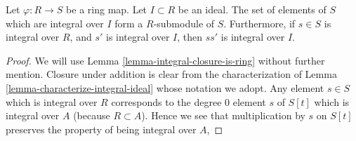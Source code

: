 \begin{lemma}
\label{lemma-integral-over-ideal-is-submodule}
Let $\varphi : R \to S$ be a ring map.
Let $I \subset R$ be an ideal.
The set of elements of $S$ which are integral
over $I$ form a $R$-submodule of $S$.
Furthermore, if $s \in S$ is integral over
$R$, and $s'$ is integral over $I$, then
$ss'$ is integral over $I$.
\end{lemma}

\begin{proof}
We will use Lemma \ref{lemma-integral-closure-is-ring} without
further mention. Closure under addition is clear from the
characterization of Lemma \ref{lemma-characterize-integral-ideal}
whose notation we adopt.
Any element $s \in S$ which is integral over
$R$ corresponds to the degree $0$ element $s$ of $S[t]$
which is integral over $A$ (because $R \subset A$).
Hence we see that multiplication by $s$ on $S[t]$
preserves the property of being integral over $A$,
\end{proof}